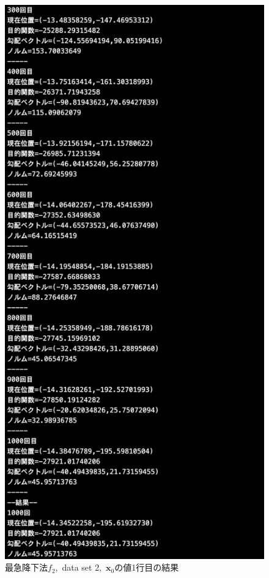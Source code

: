 \documentclass[12pt]{jarticle}
\begin{document}
\begin{figure}[h]
\begin{minipage}{0.5\hsize}
    \end{minipage}
    \begin{minipage}{0.5\hsize}
        \begin{center}
            \includegraphics[scale=0.2]{kadai1_2s_out2_1_3.png}
        \end{center}
    \end{minipage}
    \caption{最急降下法$f_2$,\ data set 2,\ $\boldsymbol{x}_0$の値1行目の結果}
\end{figure}
\end{document}
